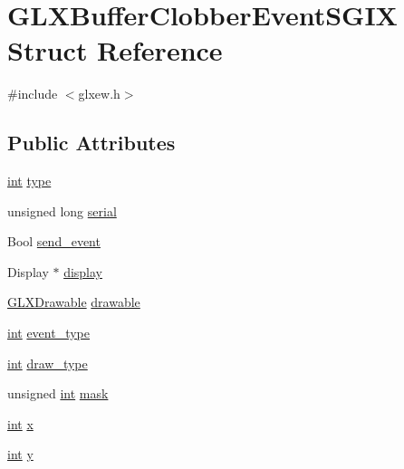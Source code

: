 \hypertarget{struct_g_l_x_buffer_clobber_event_s_g_i_x}{\section{G\-L\-X\-Buffer\-Clobber\-Event\-S\-G\-I\-X Struct Reference}
\label{struct_g_l_x_buffer_clobber_event_s_g_i_x}
}


{\ttfamily \#include $<$glxew.\-h$>$}

\subsection*{Public Attributes}
\begin{DoxyCompactItemize}
\item 
\hyperlink{wglew_8h_a500a82aecba06f4550f6849b8099ca21}{int} \hyperlink{struct_g_l_x_buffer_clobber_event_s_g_i_x_a36e3e8a5feea664623ea43d0f273b63a}{type}
\item 
unsigned long \hyperlink{struct_g_l_x_buffer_clobber_event_s_g_i_x_ac295e3276a7986eeae4d6a2a28c7e0b7}{serial}
\item 
Bool \hyperlink{struct_g_l_x_buffer_clobber_event_s_g_i_x_af43bf0edbe40a74ef58dfb546a75118b}{send\-\_\-event}
\item 
Display $\ast$ \hyperlink{struct_g_l_x_buffer_clobber_event_s_g_i_x_afef060d81026da75c846727f4a3de9d4}{display}
\item 
\hyperlink{glxew_8h_a826f51745d9d6c81bdbac47ae2b80cf7}{G\-L\-X\-Drawable} \hyperlink{struct_g_l_x_buffer_clobber_event_s_g_i_x_a9c45674193ed80a79261c3b7518ee04f}{drawable}
\item 
\hyperlink{wglew_8h_a500a82aecba06f4550f6849b8099ca21}{int} \hyperlink{struct_g_l_x_buffer_clobber_event_s_g_i_x_a0b405123f1d6528f1f4dfa7ff92bde9b}{event\-\_\-type}
\item 
\hyperlink{wglew_8h_a500a82aecba06f4550f6849b8099ca21}{int} \hyperlink{struct_g_l_x_buffer_clobber_event_s_g_i_x_a25c31e8cbec0919f74a1e93ae74175b1}{draw\-\_\-type}
\item 
unsigned \hyperlink{wglew_8h_a500a82aecba06f4550f6849b8099ca21}{int} \hyperlink{struct_g_l_x_buffer_clobber_event_s_g_i_x_a74b4ad1ad3cac011001151411f621da1}{mask}
\item 
\hyperlink{wglew_8h_a500a82aecba06f4550f6849b8099ca21}{int} \hyperlink{struct_g_l_x_buffer_clobber_event_s_g_i_x_a5118d48c3c8d5253d39922b5014b52ff}{x}
\item 
\hyperlink{wglew_8h_a500a82aecba06f4550f6849b8099ca21}{int} \hyperlink{struct_g_l_x_buffer_clobber_event_s_g_i_x_aef21efa11558a5b67861f96471c56003}{y}

\end{DoxyCompactItemize}
